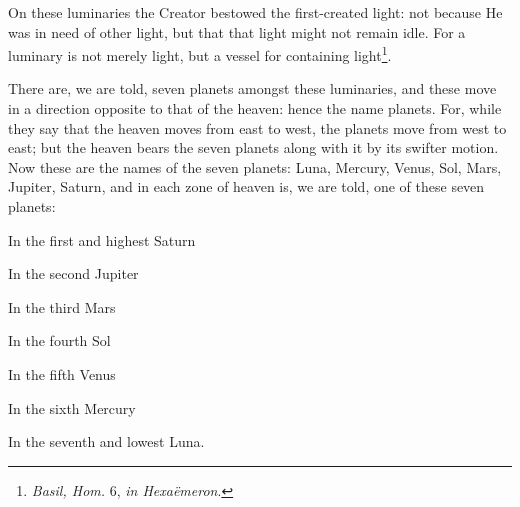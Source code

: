 On these luminaries the Creator bestowed the first-created light: not because He was in need of other light, but that that light might not remain idle. For a luminary is not merely light, but a vessel for containing light\footnote{\emph{Basil, Hom.} 6, \emph{in Hexaëmeron}.}.

There are, we are told, seven planets amongst these luminaries, and these move in a direction opposite to that of the heaven: hence the name planets. For, while they say that the heaven moves from east to west, the planets move from west to east; but the heaven bears the seven planets along with it by its swifter motion. Now these are the names of the seven planets: Luna, Mercury, Venus, Sol, Mars, Jupiter, Saturn, and in each zone of heaven is, we are told, one of these seven planets:

In the first and highest Saturn

In the second Jupiter

In the third Mars

In the fourth Sol

In the fifth Venus

In the sixth Mercury

In the seventh and lowest Luna.

